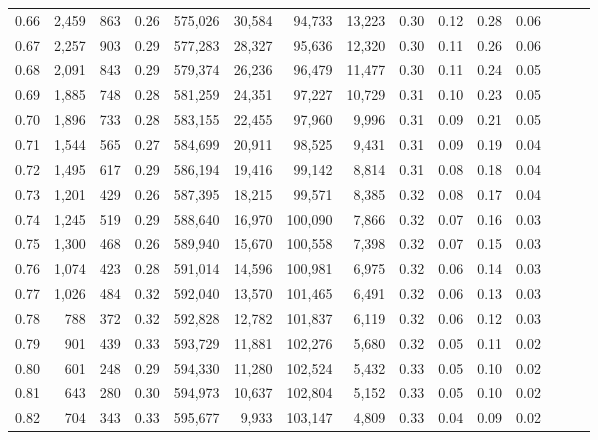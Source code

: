 \begin{tabular}{rrrrrrrrrrrrrrr}
0.66 &   2,459 &    863 &  0.26 &  575,026 &   30,584 &   94,733 &   13,223 &  0.30 &  0.12 &  0.28 &      0.06 \\
0.67 &   2,257 &    903 &  0.29 &  577,283 &   28,327 &   95,636 &   12,320 &  0.30 &  0.11 &  0.26 &      0.06 \\
0.68 &   2,091 &    843 &  0.29 &  579,374 &   26,236 &   96,479 &   11,477 &  0.30 &  0.11 &  0.24 &      0.05 \\
0.69 &   1,885 &    748 &  0.28 &  581,259 &   24,351 &   97,227 &   10,729 &  0.31 &  0.10 &  0.23 &      0.05 \\
0.70 &   1,896 &    733 &  0.28 &  583,155 &   22,455 &   97,960 &    9,996 &  0.31 &  0.09 &  0.21 &      0.05 \\
0.71 &   1,544 &    565 &  0.27 &  584,699 &   20,911 &   98,525 &    9,431 &  0.31 &  0.09 &  0.19 &      0.04 \\
0.72 &   1,495 &    617 &  0.29 &  586,194 &   19,416 &   99,142 &    8,814 &  0.31 &  0.08 &  0.18 &      0.04 \\
0.73 &   1,201 &    429 &  0.26 &  587,395 &   18,215 &   99,571 &    8,385 &  0.32 &  0.08 &  0.17 &      0.04 \\
0.74 &   1,245 &    519 &  0.29 &  588,640 &   16,970 &  100,090 &    7,866 &  0.32 &  0.07 &  0.16 &      0.03 \\
0.75 &   1,300 &    468 &  0.26 &  589,940 &   15,670 &  100,558 &    7,398 &  0.32 &  0.07 &  0.15 &      0.03 \\
0.76 &   1,074 &    423 &  0.28 &  591,014 &   14,596 &  100,981 &    6,975 &  0.32 &  0.06 &  0.14 &      0.03 \\
0.77 &   1,026 &    484 &  0.32 &  592,040 &   13,570 &  101,465 &    6,491 &  0.32 &  0.06 &  0.13 &      0.03 \\
0.78 &     788 &    372 &  0.32 &  592,828 &   12,782 &  101,837 &    6,119 &  0.32 &  0.06 &  0.12 &      0.03 \\
0.79 &     901 &    439 &  0.33 &  593,729 &   11,881 &  102,276 &    5,680 &  0.32 &  0.05 &  0.11 &      0.02 \\
0.80 &     601 &    248 &  0.29 &  594,330 &   11,280 &  102,524 &    5,432 &  0.33 &  0.05 &  0.10 &      0.02 \\
0.81 &     643 &    280 &  0.30 &  594,973 &   10,637 &  102,804 &    5,152 &  0.33 &  0.05 &  0.10 &      0.02 \\
0.82 &     704 &    343 &  0.33 &  595,677 &    9,933 &  103,147 &    4,809 &  0.33 &  0.04 &  0.09 &      0.02 \\

\end{tabular}
